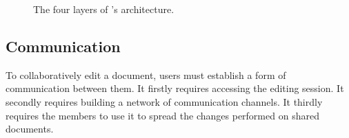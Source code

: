 \begin{figure}
  \centering
  
  \caption{\label{fig:architecture}The four layers of \CRATE's architecture.}
\end{figure}

\subsection{Communication}
\label{subsec:communication}

To collaboratively edit a document, users must establish a form of communication
between them. It firstly requires accessing the editing session. It secondly
requires building a network of communication channels. It thirdly requires the
members to use it to spread the changes performed on shared documents.  

